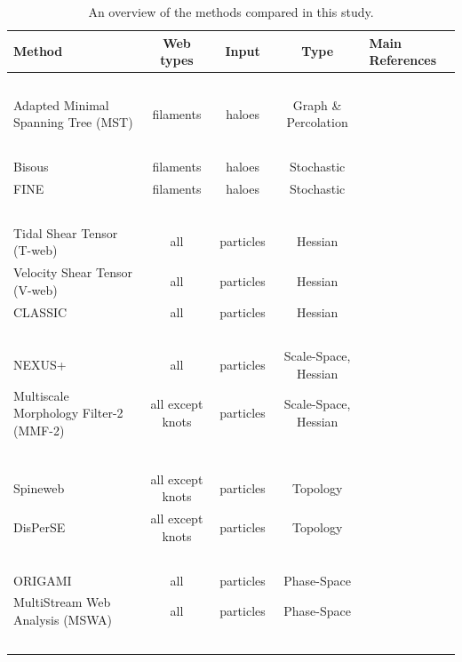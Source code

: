 \documentclass[useAMS,usenatbib]{mnras}
\begin{document}
\begin{table}
 \caption{An overview of the methods compared in this study.}
 \begin{tabular}{@{}lcccl}
  \hline\hline
  Method & Web types & Input & Type & Main References \\
  \hline
\ \\
  Adapted Minimal Spanning Tree (MST) & filaments & haloes & Graph \& Percolation & \citet{2014MNRAS.438..177A} \\
\ \\
  Bisous  & filaments & haloes & Stochastic & \citet{tempel2014,2016AC....16...17T} \\
  FINE  & filaments & haloes & Stochastic & \citet{gonzalez2010} \\
\ \\
  Tidal Shear Tensor (T-web) & all & particles & Hessian & \citet{forero2009} \\
  Velocity Shear Tensor (V-web) & all & particles & Hessian & \citet{2012MNRAS.425.2049H} \\
  CLASSIC & all & particles & Hessian & \citet{2012MNRAS.425.2443K} \\
\ \\
  NEXUS+ & all & particles & Scale-Space, Hessian & \citet{cautun2013} \\
  Multiscale Morphology Filter-2 (MMF-2) & all except knots & particles & Scale-Space, Hessian& \citet{aragon2007} \\
  &&&&\citet{aragon2014}\\
\ \\
  Spineweb	 & all except knots & particles & Topology & \citet{aragon2010a} \\
  DisPerSE & all except knots & particles & Topology & \citet{sousbie2011} \\
\ \\
  ORIGAMI & all & particles & Phase-Space & \citet{falck2012,falck2015} \\
  MultiStream Web Analysis (MSWA)& all & particles & Phase-Space & \citet{Ramachandara_Shandarin:15} \\
\ \\
  \hline
 \end{tabular}
 \label{table:methods}
\end{table}
\end{document}
